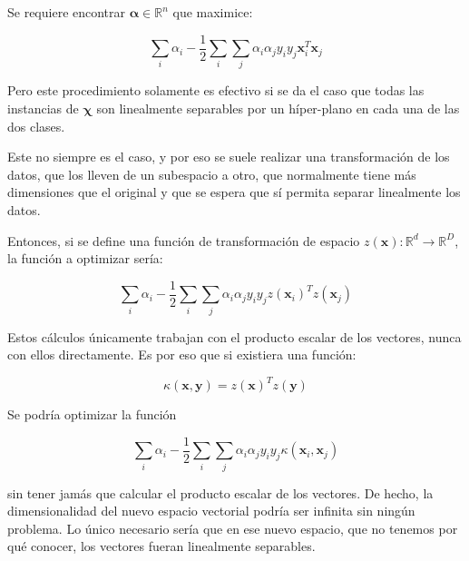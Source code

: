 \documentclass{article}
\newcommand{\reals}{\mathds{R}}
\newcommand{\vx}{\bm{x}}
\newcommand{\vy}{\bm{y}}
\begin{document}
Se requiere encontrar $\bm{\alpha} \in \reals^n$ que maximice:

\begin{equation}
 \sum_i\alpha_i - \frac{1}{2}\sum_i\sum_j\alpha_i\alpha_jy_iy_j\bm{x}_i^T\bm{x}_j
\end{equation}

%

Pero este procedimiento solamente es efectivo si se da el caso que todas las
instancias de $\bm{\chi}$ son linealmente separables por un híper-plano en cada
una de las dos clases.

Este no siempre es el caso, y por eso se suele realizar una transformación de los
datos, que los lleven de un subespacio a otro, que normalmente tiene más dimensiones
que el original y que se espera que sí permita separar linealmente los datos.

Entonces, si se define una función de transformación de espacio
$z(\bm{x}) : \reals^d \rightarrow \reals^D$, la función a optimizar sería:

\begin{equation}
 \sum_i\alpha_i - \frac{1}{2}\sum_i\sum_j\alpha_i\alpha_jy_iy_jz(\bm{x}_i)^Tz(\bm{x}_j)
\end{equation}

Estos cálculos únicamente trabajan con el producto escalar de los vectores, nunca
con ellos directamente. Es por eso que si existiera una función:

\begin{equation}
 \kappa(\vx, \vy) = z(\vx)^Tz(\vy)
\end{equation}

Se podría optimizar la función

\begin{equation}
 \sum_i\alpha_i - \frac{1}{2}\sum_i\sum_j\alpha_i\alpha_jy_iy_j\kappa(\bm{x}_i, \bm{x}_j)
\end{equation}

sin tener jamás que calcular el producto escalar de los vectores. De hecho, la
dimensionalidad del nuevo espacio vectorial podría ser infinita sin ningún problema.
Lo único necesario sería que en ese nuevo espacio, que no tenemos por qué conocer,
los vectores fueran linealmente separables.
\end{document}
